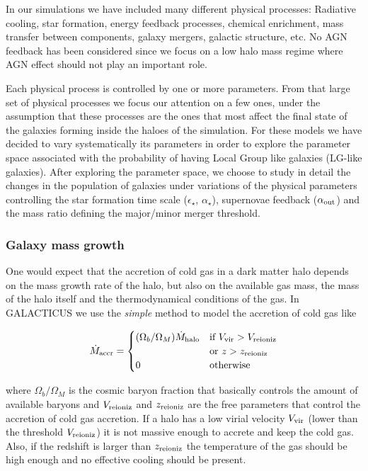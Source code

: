 \documentclass[useAMS,usenatbib]{mn2e}
\begin{document}
In our simulations we have included many different physical processes:
Radiative cooling, star formation, energy feedback processes, chemical
enrichment, mass transfer between components, galaxy mergers, galactic
structure, etc. No AGN feedback has been considered since we focus on
a low halo mass regime where AGN effect should not play an important
role.

Each physical process is controlled by one or more parameters. From
that large set of physical processes we focus our attention on a few
ones, under the assumption that these processes are the ones that most
affect the final state of the galaxies forming inside the haloes of
the simulation. For these models we have decided to vary
systematically its parameters in order to explore the parameter space
associated with the probability of having Local Group like galaxies
(LG-like galaxies). After exploring the parameter space, we choose to
study in detail the changes in the population of galaxies under
variations of the physical parameters controlling the star formation
time scale ($\epsilon_{\star}$, $\alpha_\star$), supernovae feedback
($\alpha_{\rm out}$) and the mass ratio defining the major/minor
merger threshold.


\subsubsection{Galaxy mass growth}

One would expect that the accretion of cold gas in a dark matter halo
depends on the mass growth rate of the halo, but also on the available
gas mass, the mass of the halo itself and the thermodynamical
conditions of the gas. In GALACTICUS we use the {\em simple} method to
model the accretion of cold gas like

\begin{equation}
 \dot{M}_{\rm accr}=
 \begin{cases}
   (\Omega_b/\Omega_M)\dot{M}_{{\rm halo}} & \mbox{if } V_{\rm vir}>V_{\rm reioniz}\\
                                        & \mbox{or } z>z_{\rm reioniz}\\
   0                                    & \mbox{otherwise }
\end{cases}
\end{equation}


where $\Omega_b/\Omega_M$ is the cosmic baryon fraction that basically
controls the amount of available baryons and $V_{\rm reioniz}$ and
$z_{\rm reioniz}$ are the free parameters that control the accretion
of cold gas accretion. If a halo has a low virial velocity $V_{\rm
  vir}$ (lower than the threshold $V_{\rm reioniz}$) it is not massive
enough to accrete and keep the cold gas. Also, if the redshift is
larger than $z_{\rm reioniz}$ the temperature of the gas should be
high enough and no effective cooling should be present.
\end{document}
